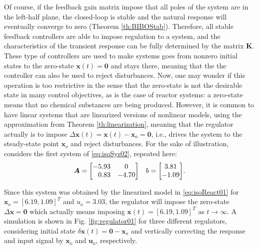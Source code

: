 \documentclass[a4paper,11pt]{book}
\numberwithin{figure}{chapter}
\numberwithin{equation}{chapter}
\numberwithin{table}{chapter}
\theoremstyle{definition}
\begin{document}
Of course, if the feedback gain matrix impose that all poles of the system are in the left-half plane, the closed-loop is stable and the natural response will eventually converge to zero (Theorem \ref{th:BIBOStab}). Therefore, all stable feedback controllers are able to impose regulation to a system, and the characteristics of the transient response can be fully determined by the matrix $\bm{K}$. These type of controllers are used to make systems goes from nonzero initial states to the zero-state $\bm{x}(t) = \bm{0}$ and stays there, meaning that the the controller can also be used to reject disturbances. Now, one may wonder if this operation is too restrictive in the sense that the zero-state is not the desirable state in many control objectives, as is the case of reactor systems: a zero-state means that no chemical substances are being produced. However, it is common to have linear systems that are   linearized versions of nonlinear models, using the approximation from Theorem \ref{th:linearization}, meaning that the regulator actually is to impose $\Delta \bm{x}(t) = \bm{x}(t) - \bm{x}_o = \bm{0}$, i.e., drives the system to the steady-state point $\bm{x}_o$ and reject disturbances. For the sake of illustration, considers the first system of \eqref{eq:isoSys02}, repeated here:
\begin{equation} \label{eq:isoSys02Rep}
\begin{matrix}
    \bm{A} = \begin{bmatrix} 
        -5.93  &      0 \\
        \hfill 0.83   &  -4.70 
    \end{bmatrix} & b = \begin{bmatrix} 3.81 \\ -1.09 \end{bmatrix}
\end{matrix}    
.\end{equation}


Since this system was obtained by the linearized model in \eqref{eq:isoReact01} for $\bm{x}_o = [6.19, 1.09]^T$ and $u_o = 3.03$, the regulator will impose the zero-state $\Delta \bm{x} = \bm{0}$ which actually means imposing $\bm{x}(t) = [6.19, 1.09]^T$ as $t \to \infty$. A simulation is shown in Fig. \ref{fig:regulator01} for three different regulators, considering initial state $\delta \bm{x}(t) = \bm{0} - \bm{x}_o$ and vertically correcting the response and input signal by $\bm{x}_o$ and $\bm{u}_o$, respectively.
\end{document}
